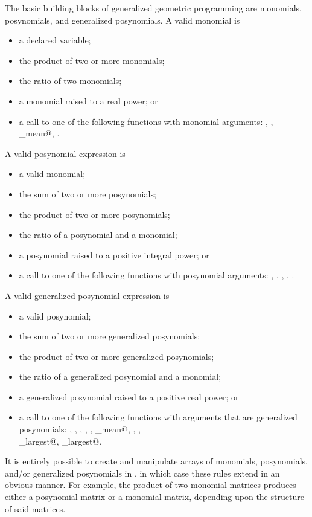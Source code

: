 \documentclass[12pt]{article}
\begin{document}
The basic building blocks of generalized geometric programming are
monomials, posynomials, and generalized posynomials. A valid monomial is
\begin{itemize}
\item a declared variable;
\item the product of two or more monomials;
\item the ratio of two monomials;
\item a monomial raised to a real power; or
\item a call to one of the following functions with monomial arguments:
      \verb@prod@, \verb@cumprod@, \verb@geo_mean@, \verb@sqrt@.
\end{itemize}
A valid posynomial expression is
\begin{itemize}
\item a valid monomial;
\item the sum of two or more posynomials;
\item the product of two or more posynomials;
\item the ratio of a posynomial and a monomial;
\item a posynomial raised to a positive integral power; or
\item a call to one of the following functions with posynomial arguments:
      \verb@sum@, \verb@cumsum@, \verb@mean@, \verb@prod@, \verb@cumprod@.
\end{itemize}
A valid generalized posynomial expression is
\begin{itemize}
\item a valid posynomial;
\item the sum of two or more generalized posynomials;
\item the product of two or more generalized posynomials;
\item the ratio of a generalized posynomial and a monomial;
\item a generalized posynomial raised to a positive real power; or
\item a call to one of the following functions with arguments
      that are generalized posynomials: \verb@sum@, \verb@cumsum@,
      \verb@mean@, \verb@prod@, \verb@cumprod@, \verb@geo_mean@,
      \verb@sqrt@, \verb@norm@, \\ \verb@sum_largest@, \verb@norm_largest@.
\end{itemize}
It is entirely possible to create and manipulate arrays of monomials,
posynomials, and/or generalized posynomials in \cvx, in which case these
rules extend in an obvious manner. For example, the product of two
monomial matrices produces either a posynomial matrix or a monomial 
matrix, depending upon the structure of said matrices.
\end{document}
